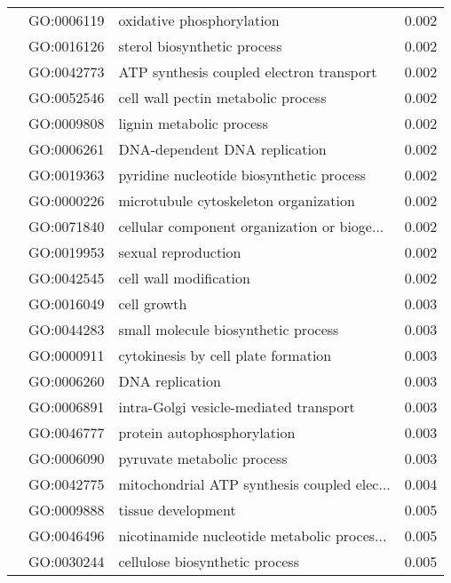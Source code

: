 \begin{longtable}{lllr}
   & GO:0006119 &                    oxidative phosphorylation &         0.002 \\
   & GO:0016126 &                  sterol biosynthetic process &         0.002 \\
   & GO:0042773 &     ATP synthesis coupled electron transport &         0.002 \\
   & GO:0052546 &           cell wall pectin metabolic process &         0.002 \\
   & GO:0009808 &                     lignin metabolic process &         0.002 \\
   & GO:0006261 &                DNA-dependent DNA replication &         0.002 \\
   & GO:0019363 &     pyridine nucleotide biosynthetic process &         0.002 \\
   & GO:0000226 &        microtubule cytoskeleton organization &         0.002 \\
   & GO:0071840 &  cellular component organization or bioge... &         0.002 \\
   & GO:0019953 &                          sexual reproduction &         0.002 \\
   & GO:0042545 &                       cell wall modification &         0.002 \\
   & GO:0016049 &                                  cell growth &         0.003 \\
   & GO:0044283 &          small molecule biosynthetic process &         0.003 \\
   & GO:0000911 &          cytokinesis by cell plate formation &         0.003 \\
   & GO:0006260 &                              DNA replication &         0.003 \\
   & GO:0006891 &       intra-Golgi vesicle-mediated transport &         0.003 \\
   & GO:0046777 &                  protein autophosphorylation &         0.003 \\
   & GO:0006090 &                   pyruvate metabolic process &         0.003 \\
   & GO:0042775 &  mitochondrial ATP synthesis coupled elec... &         0.004 \\
   & GO:0009888 &                           tissue development &         0.005 \\
   & GO:0046496 &  nicotinamide nucleotide metabolic proces... &         0.005 \\
   & GO:0030244 &               cellulose biosynthetic process &         0.005 \\

\end{longtable}
